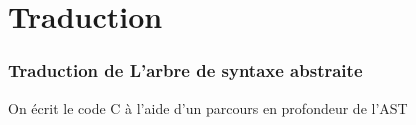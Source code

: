 \section{Traduction}

\begin{frame}
    
\end{frame}

\begin{frame}
    \frametitle{Traduction de L'arbre de syntaxe abstraite\esp}
    \begin{center}
        
    \end{center}
    \vspace{0.5cm}
    On écrit le code C à l'aide d'un parcours en profondeur de l'AST


\end{frame}

